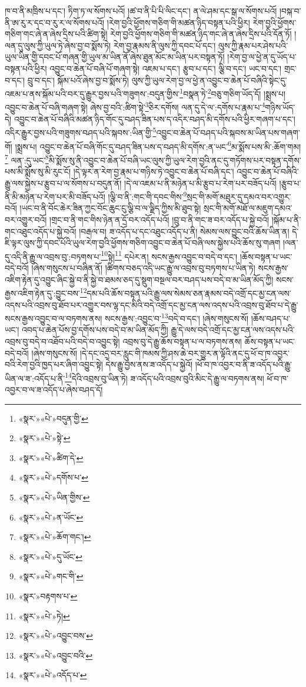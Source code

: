 ཁ་བ་ནི་མཁྲིས་པ་དང་། ཏིག་ཏ་ལ་སོགས་པའོ། །ཚ་བ་ནི་པི་པི་ལིང་དང་། ན་ལེ་ཤམ་དང་སྒ་ལ་སོགས་པའོ། །བསྐ་བ་ནི་ཨ་རུ་ར་དང་བ་རུ་ར་ལ་སོགས་པའོ། །རེག་བྱའི་ཕྱོགས་གཅིག་གི་མཚན་ཉིད་བསྟན་པའི་ཕྱིར། རེག་བྱའི་ཕྱོགས་གཅིག་གང་ཞེ་ན་ཞེས་དྲིས་པའི་ཚིག་སྟེ། རེག་བྱའི་ཕྱོགས་གཅིག་གི་མཚན་ཉིད་གང་ཞེ་ན་ཞེས་དྲིས་པའི་དོན་ཏོ། །ལན་དུ་ལུས་ཀྱི་ཡུལ་ཏེ་ཞེས་བྱ་བ་སྨོས་ཏེ། རེག་བྱ་རྣམས་ནི་ལུས་ཀྱི་དབང་པོ་དང་། ལུས་ཀྱི་རྣམ་པར་ཤེས་པའི་ཡུལ་ཡིན་གྱི་དབང་པོ་གཞན་གྱི་ཡུལ་མ་ཡིན་ནོ་ཞེས་ཐུན་མོང་མ་ཡིན་པར་བསྟན་ཏོ། །རེག་བྱ་ལ་ཕྱེ་ན་དུ་ཡོད་པ་བསྟན་པའི་ཕྱིར། འབྱུང་བ་ཆེན་པོ་བཞི་པོ་གཞག་སྟེ། འཇམ་པ་དང་། རྩུབ་པ་དང་། ལྕི་བ་དང་། ཡང་བ་དང་། གྲང་བ་དང་། བྲུ་བ་དང་། སྐོམ་པའོ་ཞེས་བྱ་བ་སྨོས་ཏེ། ལུས་ཀྱི་ཡུལ་རེག་བྱ་ལ་ཕྱེ་ན་འབྱུང་བ་ཆེན་པོ་བཞིའི་སྟེང་དུ་འཇམ་པ་ནས་སྐོམ་པའི་བར་དུ་རྒྱུར་བྱས་པའི་གཟུགས་:བདུན་གྱིས་\footnote{«སྣར་»«པེ་»བདུན་གྱི་}བསྣན་ཏེ་\footnote{«སྣར་»«པེ་»སྟེ་}བཅུ་གཅིག་ཡོད་དོ། །སྨྲས་པ། འབྱུང་བ་ཆེན་པོ་བཞི་གཞག་སྟེ། ཞེས་བྱ་བའི་:ཚིག་སྟེ་\footnote{«སྣར་»«པེ་»ཚིག་དེ་}ཅིར་དགོས། ལན་དུ་དེ་ལ་:དགོས་པ་རྣམ་པ་\footnote{«སྣར་»«པེ་»དགོས་པ་}གཉིས་ཡོད་དེ། འབྱུང་བ་ཆེན་པོ་བཞིའི་མཚན་ཉིད་གོང་དུ་བཤད་ཟིན་པས་ད་འདིར་བཤད་མི་དགོས་པའི་ཕྱིར་གཞག་པ་དང་། འདིར་རྒྱུར་བྱས་པའི་གཟུགས་བཤད་པའི་སྐབས་:ཡིན་གྱི་\footnote{«སྣར་»«པེ་»ཡིན་གྱིས་}འབྱུང་བ་ཆེན་པོ་བཤད་པའི་སྐབས་མ་ཡིན་པས་གཞག་གོ། །སྨྲས་པ། འབྱུང་བ་ཆེན་པོ་བཞི་གོང་དུ་བཤད་ཟིན་པས་ད་བཤད་མི་དགོས་:ན་ཡང་\footnote{«སྣར་»«པེ་»ན་ཡོང་}མ་སྨོས་པས་མི་:ཆོག་གམ།\footnote{«སྣར་»«པེ་»ཆོག་གང་།} ལན་:དུ་ཡང་\footnote{«སྣར་»«པེ་»དུ་ཡོང་}མི་སྨོས་སུ་ནི་འབྱུང་བ་ཆེན་པོ་བཞི་ཡང་ལུས་ཀྱི་ཡུལ་རེག་བྱའི་ནང་དུ་གཏོགས་པར་བསྟན་དགོས་པས་མི་སྨོས་སུ་མི་རུང་ངོ། །དེ་ལྟར་ན་རེག་བྱ་རྣམ་པ་གཉིས་ཏེ་འབྱུང་བ་ཆེན་པོ་བཞི་དང་། འབྱུང་བ་ཆེན་པོ་བཞིའི་རྒྱུ་ལས་སྐྱེས་པ་རྩུབ་པ་ལ་སོགས་པ་བདུན་ནོ། །དེ་ལ་འཇམ་པ་ནི་མཉེན་པ་མི་རྩུབ་པ་རེག་པར་བཟོད་པའོ། །རྩུབ་པ་ནི་མི་མཉེན་པ་རེག་པར་མི་བཟོད་པའོ། །ལྕི་བ་ནི་:གང་གི་དབང་གིས་\footnote{«སྣར་»«པེ་»གང་གི་}སྲང་གི་མགོ་མཐུར་དུ་དམའ་བར་འགྱུར་བའོ། །ཡང་བ་ནི་བོང་ཆེར་ཟིན་ཀྱང་བོང་ཆུང་ངུ་ལྕི་བ་ལ་ལྗིད་ཀྱིས་མི་ཐུབ་སྟེ། སྲང་གི་མགོ་མཐོ་ལ་མཇུག་དམའ་བར་འགྱུར་བའོ། །གྲང་བ་ནི་གང་གིས་ཉེན་ན་དྲོ་བར་འདོད་པའོ། །བྲུ་བ་ནི་གང་ཟ་བར་འདོད་པ་སྐྱེ་བའོ། །སྐོམ་པ་ནི་གང་འཐུང་འདོད་པ་སྐྱེ་བའོ། །བརྒལ་བ། ཟ་འདོད་པ་དང་འཐུང་འདོད་པ་ནི། སེམས་ལས་བྱུང་བའི་ཆོས་ཡིན་ན། དེ་ཇི་ལྟར་ལུས་ཀྱི་དབང་པོའི་ཡུལ་རེག་བྱའི་ཕྱོགས་གཅིག་འབྱུང་བ་ཆེན་པོ་བཞི་ལས་སྐྱེས་པའི་ཆོས་སུ་གཞག །ལན་དུ་འདི་ནི་རྒྱུ་ལ་འབྲས་བུ་:བཏགས་པ་\footnote{«སྣར་»བརྟགས་པ་}སྟེ།\footnote{«སྣར་»«པེ་»ཏེ།} དཔེར་ན། སངས་རྒྱས་འབྱུང་བ་བདེ་བ་དང་། །ཆོས་བསྟན་པ་ཡང་བདེ་བའོ། །ཞེས་གསུངས་པ་བཞིན་ནོ། །ཚིགས་བཅད་འདི་ཡང་རྒྱུ་ལ་འབྲས་བུ་བཏགས་པ་ཡིན་ཏེ། སངས་རྒྱས་འཇིག་རྟེན་དུ་འབྱུང་ཞིང་སྐྱེ་བ་ནི་སྐྱེ་བ་ཐམས་ཅད་དུ་སྡུག་བསྔལ་བར་བཤད་པས་བདེ་བ་མ་ཡིན་མོད་ཀྱི། སངས་རྒྱས་འཇིག་རྟེན་དུ་:བྱུང་བས་\footnote{«སྣར་»«པེ་»འབྱུང་བས་}དམ་པའི་ཆོས་བསྟན་པའི་རྒྱུ་ལས་སེམས་ཅན་རྣམས་བདེ་འགྲོ་དང་མྱ་ངན་ལས་འདས་པའི་འབྲས་བུ་ཐོབ་པར་འགྱུར་བས་ལྷ་དང་མིའི་བདེ་འགྲོ་དང་མྱ་ངན་ལས་འདས་པའི་འབྲས་བུ་ཐོབ་པ་དེ་རྒྱུ་སངས་རྒྱས་འབྱུང་བ་ལ་བཏགས་ནས། སངས་རྒྱས་:འབྱུང་བ་\footnote{«སྣར་»«པེ་»འབྱུང་བའི་}བདེ་བ་དང་། །ཞེས་གསུངས་སོ། །ཆོས་བཤད་པ་ཡང་། འབད་པ་ཆེན་པོས་བྱ་དགོས་པས་བདེ་བ་མ་ཡིན་མོད་ཀྱི། རྒྱུ་དེ་ལས་བདེ་འགྲོ་དང་མྱ་ངན་ལས་འདས་པའི་འབྲས་བུ་བདེ་བ་འཐོབ་པའི་བདེ་བ་འབྱུང་སྟེ། འབྲས་བུ་དེ་རྒྱུ་ཆོས་བསྟན་པ་ལ་བཏགས་ནས། ཆོས་བསྟན་པ་ཡང་བདེ་བའོ། །ཞེས་གསུངས་སོ། །དེ་དང་འདྲ་བར་རླུང་གི་ཁམས་ཀྱི་ཤས་ཆེ་བར་གྱུར་ན་ལྟོའི་ནང་དུ་ཕོ་བ་ཁ་འབྱར་བའི་རེག་བྱའི་ཁྱད་པར་ཞིག་འབྱུང་སྟེ། དེས་རྒྱུ་བྱས་ནས་ཟ་འདོད་པ་སྐྱེའོ། །ཕོ་བ་ཁ་འབྱར་བ་ནི་ཟ་འདོད་པའི་རྒྱུ་ཡིན་ལ་ཟ་:འདོད་པ་ནི་\footnote{«སྣར་»«པེ་»འདོད་པ་}དེའི་འབྲས་བུ་ཡིན་ཏེ། ཟ་འདོད་པའི་འབྲས་བུའི་མིང་དེ་རྒྱུ་ལ་བཏགས་ནས། ཕོ་བ་ཁ་འབྱར་བ་ལ་ཟ་འདོད་པ་ཞེས་བཤད་དོ། 